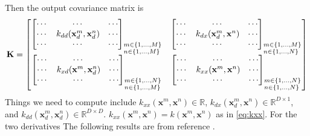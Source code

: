 \documentclass[10pt,oneside,a4paper,notitlepage]{article}
\newcommand{\vect}[1]{\mathbf{#1}}
\begin{document}
Then the output covariance matrix is
\begin{align}
\vect K = \begin{bmatrix}
\begin{bmatrix} \cdots & \cdots & \cdots \\ \cdots & k_{dd}(\vect x_d^m, \vect x_d^n) & \cdots \\ \cdots & \cdots & \cdots \end{bmatrix}_{\begin{subarray}{l}m\in\{1,\ldots,M\}\\ n\in\{1,\ldots,M\}\end{subarray}} & 
\begin{bmatrix} \cdots & \cdots & \cdots \\ \cdots & k_{dx}(\vect x_d^m, \vect x^n) & \cdots \\ \cdots & \cdots & \cdots \end{bmatrix}_{\begin{subarray}{l}m\in\{1,\ldots,M\}\\ n\in\{1,\ldots,N\}\end{subarray}}\\ 
\begin{bmatrix} \cdots & \cdots & \cdots \\ \cdots & k_{xd}(\vect x^m, \vect x_d^n) & \cdots \\ \cdots & \cdots & \cdots \end{bmatrix}_{\begin{subarray}{l}m\in\{1,\ldots,N\}\\ n\in\{1,\ldots,M\}\end{subarray}} & 
\begin{bmatrix} \cdots & \cdots & \cdots \\ \cdots & k_{xx}(\vect x^m, \vect x^n) & \cdots \\ \cdots & \cdots & \cdots \end{bmatrix}_{\begin{subarray}{l}m\in\{1,\ldots,N\}\\ n\in\{1,\ldots,N\}\end{subarray}} 
\end{bmatrix}
\end{align}
Things we need to compute include $k_{xx}(\vect x^m, \vect x^n)\in\mathbb R$, $k_{dx}(\vect x_d^m, \vect x^n)\in\mathbb R^{D\times 1}$, and $k_{dd}(\vect x_d^m, \vect x_d^n)\in\mathbb R^{D\times D}$.
$k_{xx}(\vect x^m, \vect x^n)=k(\vect x^m, \vect x^n)$ as in \eqref{eq:kxx}. For the two derivatives
The following results are from reference \cite{}.
\end{document}
